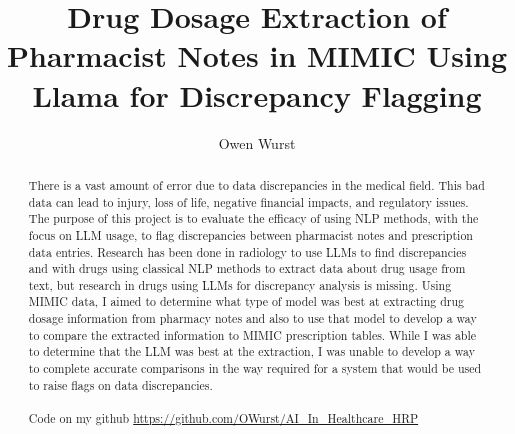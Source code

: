 \documentclass[sigconf,nonacm]{acmart} %
\title[Notes Drug Extraction]{Drug Dosage Extraction of Pharmacist Notes in MIMIC Using Llama for Discrepancy Flagging}
\author{Owen Wurst}
\affiliation{%
  \institution{University of Texas}
  \city{Austin}
  \state{Texas}
  \country{USA}
}
\begin{document}
\begin{abstract}
There is a vast amount of error due to data discrepancies in the medical field. This bad data can lead to injury, loss of life, negative financial impacts, and regulatory issues. The purpose of this project is to evaluate the efficacy of using NLP methods, with the focus on LLM usage, to flag discrepancies between pharmacist notes and prescription data entries. Research has been done in radiology to use LLMs to find discrepancies and with drugs using classical NLP methods to extract data about drug usage from text, but research in drugs using LLMs for discrepancy analysis is missing. Using MIMIC data, I aimed to determine what type of model was best at extracting drug dosage information from pharmacy notes and also to use that model to develop a way to compare the extracted information to MIMIC prescription tables. While I was able to determine that the LLM was best at the extraction, I was unable to develop a way to complete accurate comparisons in the way required for a system that would be used to raise flags on data discrepancies. 
\\\\Code on my github \url{https://github.com/OWurst/AI_In_Healthcare_HRP}
\end{abstract}


\maketitle
\vspace*{2\baselineskip}
\end{document}
